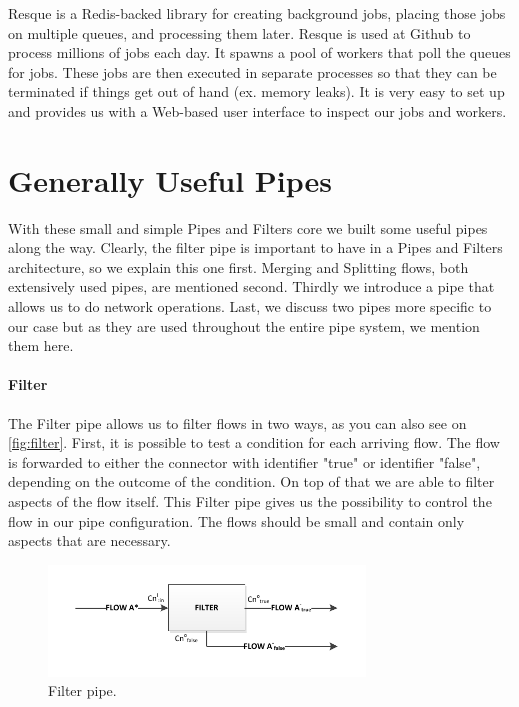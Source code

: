 Resque is a Redis-backed library for creating background jobs, placing those jobs on multiple queues, and processing them later. Resque is used at Github to process millions of jobs each day. It spawns a pool of workers that poll the queues for jobs. These jobs are then executed in separate processes so that they can be terminated if things get out of hand (ex. memory leaks). It is very easy to set up and provides us with a Web-based user interface to inspect our jobs and workers.

\section{Generally Useful Pipes}

With these small and simple Pipes and Filters core we built some useful pipes along the way. Clearly, the filter pipe is important to have in a Pipes and Filters architecture, so we explain this one first. Merging and Splitting flows, both extensively used pipes, are mentioned second. Thirdly we introduce a pipe that allows us to do network operations. Last, we discuss two pipes more specific to our case but as they are used throughout the entire pipe system, we mention them here.

\paragraph{Filter} \label{par:filterpipe} The Filter pipe allows us to filter flows in two ways, as you can also see on \autoref{fig:filter}. First, it is possible to test a condition for each arriving flow. The flow is forwarded to either the connector with identifier "true" or identifier "false", depending on the outcome of the condition. On top of that we are able to filter aspects of the flow itself. This Filter pipe gives us the possibility to control the flow in our pipe configuration. The flows should be small and contain only aspects that are necessary.

\begin{figure}[htp]
	\centering
		\includegraphics[width=0.75\textwidth]{fig/filter}
	\caption{Filter pipe.}
	\label{fig:filter}
\end{figure}

